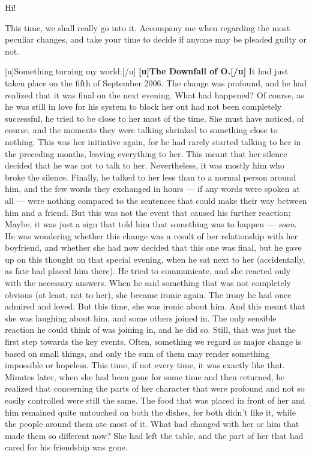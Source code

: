 Hi! 

This time, we shall really go into it. Accompany me when regarding the most peculiar changes, and take your time to decide if anyone may be pleaded guilty or not. 

[u]Something turning my world:[/u]
\textbf{[u]The Downfall of O.[/u]}
It had just taken place on the fifth of September 2006. The change was profound, and he had realized that it was final on the next evening. 
What had happened? Of course, as he was still in love for his system to block her out had not been completely successful, he tried to be close to her most of the time. She must have noticed, of course, and the moments they were talking shrinked to something close to nothing. This was her initiative again, for he had rarely started talking to her in the preceding months, leaving everything to her. This meant that her silence decided that he was not to talk to her. 
Nevertheless, it was mostly him who broke the silence. Finally, he talked to her less than to a normal person around him, and the few words they exchanged in hours --- if any words were spoken at all --- were nothing compared to the sentences that could make their way between him and a friend. 
But this was not the event that caused his further reaction; Maybe, it was just a sign that told him that something was to happen --- \emph{soon}. He was wondering whether this change was a result of her relationship with her boyfriend, and whether she had now decided that this one was final, but he gave up on this thought on that special evening, when he sat next to her (accidentally, as fate had placed him there). 
He tried to communicate, and she reacted only with the necessary answers. When he said something that was not completely obvious (at least, not to her), she became ironic again. 
The irony he had once admired and loved. 
But this time, she was ironic about him. 
And this meant that she was laughing about him, and some others joined in. The only sensible reaction he could think of was joining in, and he did so. Still, that was just the first step towards the key events. Often, something we regard as major change is based on small things, and only the sum of them may render something impossible or hopeless. 
This time, if not every time, it was exactly like that. Minutes later, when she had been gone for some time and then returned, he realized that concerning the parts of her character that were profound and not so easily controlled were still the same. The food that was placed in front of her and him remained quite untouched on both the dishes, for both didn't like it, while the people around them ate most of it. What had changed with her or him that made them so different now? She had left the table, and the part of her that had cared for his friendship was gone. 
